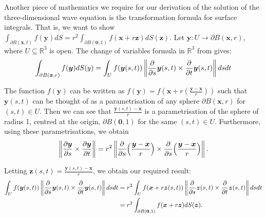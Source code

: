 \documentclass[a4paper, 12pt]{article}
\numberwithin{equation}{section}
\begin{document}
Another piece of mathematics we require for our derivation of the solution of
the three-dimensional wave equation is the transformation formula for surface
integrals. That is, we want to show $\int_{\partial
B(\boldsymbol{x},t)}f(\boldsymbol{y})dS=r^2\int_{\partial B(\boldsymbol{0},1)}
f(\boldsymbol{x}+r\boldsymbol{z})dS(\boldsymbol{z})$. Let $\boldsymbol{y}:U \rightarrow
\partial B(\boldsymbol{x}, r)$, where $U \subseteq \mathbb{R}^3$ is open. The change of variables
formula in $\mathbb{R}^3$ from \cite[Ch. 11, Th. 11.1]{LooSter} gives:
\begin{equation*}
    \int_{\partial B(\boldsymbol{x},r)}f(\boldsymbol{y})dS(y)=\int_U f(\boldsymbol{y}(s,t))\left\| \diffp[1]{}{s}\boldsymbol{y}(s, t) \times \diffp[1]{}{t}\boldsymbol{y}(s, t) \right \|ds dt
\end{equation*}

The function $f(\boldsymbol{y})$ can be written as
$f(\boldsymbol{y})=f(\boldsymbol{x}+r(\frac{\boldsymbol{y}-\boldsymbol{x}}{r}))$
such that $\boldsymbol{y}(s,t)$ can be thought of as a parametrisation of any
sphere $\partial B(\boldsymbol{x},r)$ for $(s,t)\in U$. Then we can see that
$\frac{\boldsymbol{y}(s,t)-\boldsymbol{x}}{r}$ is a parametrisation of the
sphere of radius 1, centred at the origin, $\partial B(\boldsymbol{0},1)$ for
the same $(s,t)\in U$. Furthermore, using these parametrisations, we obtain
\begin{equation*}
    \left \| \diffp[1]{\boldsymbol{y}}{s} \times \diffp[1]{\boldsymbol{y}}{t} \right \| =r^2 \left \| \diffp[1]{}{s}\Big(\frac{\boldsymbol{y}-\boldsymbol{x}}{r}\Big) \times \diffp[1]{}{s}\Big( \frac{\boldsymbol{y}-\boldsymbol{x}}{r}\Big) \right \|.
\end{equation*}

Letting $\boldsymbol{z}(s,t)=\frac{\boldsymbol{y}(s,t)-\boldsymbol{x}}{r}$, we
obtain our required result:
\begin{equation*}
    \begin{aligned}
    \int_U f(\boldsymbol{y}(s,t)) \left \| \diffp[1]{}{s}\boldsymbol{y}(s, t) \times \diffp{}{t}\boldsymbol{y}(s, t) \right \| dsdt&=r^2\int_U f(\boldsymbol{x}+r\boldsymbol{z}(s,t)) \left \| \diffp[1]{}{s}\boldsymbol{z}(s, t) \times \diffp[1]{}{t}\boldsymbol{z}(s, t) \right \| dsdt\\
    &=r^2\int_{\partial B(\boldsymbol{0},1)}f(\boldsymbol{x}+r\boldsymbol{z})dS(\boldsymbol{z}).
    \end{aligned}
\end{equation*}
\end{document}
